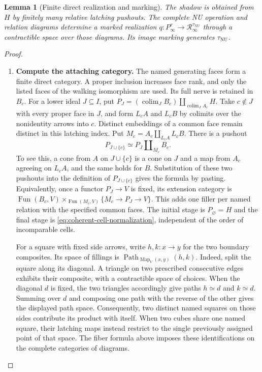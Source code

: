 \documentclass[oneside]{article}
\theoremstyle{plain}
\newtheorem{lemma}[theorem]{Lemma}
\theoremstyle{definition}
\theoremstyle{remark}
\newcommand{\Fun}{\operatorname{Fun}}
\newcommand{\Map}{\operatorname{Map}}
\newcommand{\NU}{\mathrm{NU}}
\newcommand{\RNU}{\mathcal R_{\infty}}
\newcommand{\colim}{\operatorname*{colim}}
\begin{document}
\begin{lemma}[Finite direct realization and marking]
\label{lem:coherent-cell-normalization}
\label{prop:incidence-marking}
The shadow is obtained from $H$ by finitely many relative latching
pushouts. The complete NU operation and relation diagrams determine a
marked realization $q:P_\infty^\tau\to\RNU^{\tau_{\NU}}$ through a
contractible space over those diagrams. Its image marking generates
$\tau_{\NU}$.
\end{lemma}
\begin{proof}
\leavevmode
\begin{enumerate}
\item \textbf{Compute the attaching category.}
The named generating faces form a finite direct category. A proper
inclusion increases face rank, and only the listed faces of the walking
isomorphism are used. Its full nerve is retained in $B_c$. For a lower
ideal $J\subseteq I$, put
$P_J=(\colim_J B_c)\amalg_{\colim_J A_c}H$.
Take $c\notin J$ with every proper face in $J$, and form
$L_cA$ and $L_cB$ by colimits over the nonidentity arrows into $c$.
Distinct embeddings of a common face remain distinct in this latching
index. Put $M_c=A_c\amalg_{L_cA}L_cB$. There is a pushout
\[
 P_{J\cup\{c\}}\simeq P_J\amalg_{M_c}B_c .
\]
To see this, a cone from $A$ on $J\cup\{c\}$ is a cone on $J$ and
a map from $A_c$ agreeing on $L_cA$, and the same holds for $B$.
Substitution of these two pushouts into the definition of
$P_{J\cup\{c\}}$ gives the formula by pasting. Equivalently, once
a functor $P_J\to V$ is fixed, its extension category is
$\Fun(B_c,V)\times_{\Fun(M_c,V)}\{M_c\to P_J\to V\}$.
This adds one filler per named relation with the specified common
faces. The initial stage is $P_\varnothing=H$ and the final stage is
\eqref{eq:coherent-cell-normalization}, independent of the order of
incomparable cells.

For a square with fixed side arrows, write $h,k:x\to y$ for the
two boundary composites. Its space of fillings is
$\operatorname{Path}_{\Map_V(x,y)}(h,k)$. Indeed, split the square
along its diagonal. A triangle on two prescribed consecutive edges
exhibits their composite, with a contractible space of choices.
When the diagonal $d$ is fixed, the two triangles accordingly give
paths $h\simeq d$ and $k\simeq d$. Summing over $d$ and composing
one path with the reverse of the other gives the displayed path
space. Consequently, two distinct named squares on those sides
contribute its product with itself. When two cubes share one named
square, their latching maps instead restrict to the single previously
assigned point of that space. The fiber formula above imposes these
identifications on the complete categories of diagrams.


\end{enumerate}
\end{proof}
\end{document}
